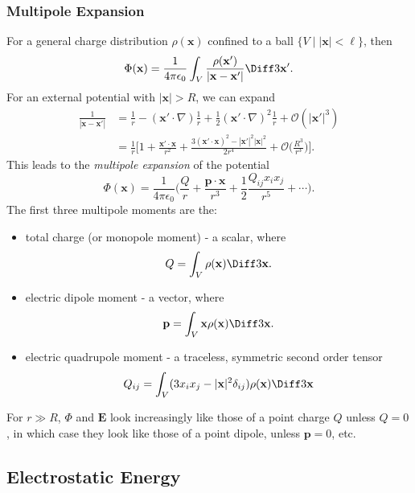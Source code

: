 \documentclass[12pt]{article}
\begin{document}
\subsubsection{Multipole Expansion}
\label{subsub:multipole_expansion}

For a general charge distribution $\rho(\mathbf{x})$ confined to a ball $\{V \mid |\mathbf{x}| < \ell\}$, then
\[
\Phi(\mathbf{x}) = \frac{1}{4 \pi \epsilon_0} \int_{V} \frac{\rho(\mathbf{x}')}{|\mathbf{x} - \mathbf{x}'|} \Diff3 \mathbf{x}'
.\]
For an external potential with $|\mathbf{x}| > R$, we can expand
\begin{align*}
	\frac{1}{|\mathbf{x} - \mathbf{x}'|} &= \frac{1}{r} - (\mathbf{x}' \cdot \nabla) \frac{1}{r} + \frac{1}{2} (\mathbf{x}' \cdot \nabla)^2 \frac{1}{r} + \mathcal{O}(|\mathbf{x}'|^3) \\
					     &= \frac{1}{r} \biggl[ 1 + \frac{\mathbf{x}' \cdot \mathbf{x}}{r^2} + \frac{3(\mathbf{x}' \cdot \mathbf{x})^2 - |\mathbf{x}'|^2|\mathbf{x}|^2}{2r^{4}} + \mathcal{O} \biggl( \frac{R^3}{r^3} \biggr) \biggr].
\end{align*}
This leads to the \emph{multipole expansion} of the potential
\[
\Phi(\mathbf{x}) = \frac{1}{4 \pi \epsilon_0} \biggl( \frac{Q}{r} + \frac{\mathbf{p} \cdot \mathbf{x}}{r^3} + \frac{1}{2} \frac{Q_{ij}x_ix_j}{r^{5}} + \cdots \biggr)
.\]
The first three multipole moments are the:
\begin{itemize}
	\item total charge (or monopole moment) - a scalar, where
		\[
			Q = \int_{V} \rho(\mathbf{x}) \Diff3 \mathbf{x}.
		\]
	\item electric dipole moment - a vector, where
		\[
			\mathbf{p} = \int_{V} \mathbf{x} \rho(\mathbf{x}) \Diff3 \mathbf{x}.
		\]
	\item electric quadrupole moment - a traceless, symmetric second order tensor
		\[
			Q_{ij} = \int_{V}(3x_ix_j - |\mathbf{x}|^2 \delta_{ij}) \rho(\mathbf{x}) \Diff3 \mathbf{x}
		\]
\end{itemize}

For $r \gg R$, $\Phi$ and $\mathbf{E}$ look increasingly like those of a point charge $Q$ unless $Q = 0$, in which case they look like those of a point dipole, unless $\mathbf{p} = 0$, etc.

\subsection{Electrostatic Energy}
\label{sub:electrostatic_energy}
\end{document}

